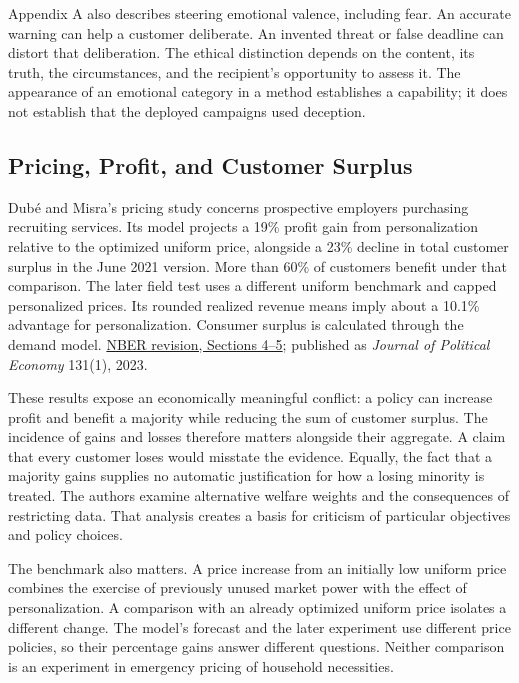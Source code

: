 Appendix A also describes steering emotional valence, including fear. An
accurate warning can help a customer deliberate. An invented threat or
false deadline can distort that deliberation. The ethical distinction
depends on the content, its truth, the circumstances, and the
recipient's opportunity to assess it. The appearance of an emotional
category in a method establishes a capability; it does not establish
that the deployed campaigns used deception.

\hypertarget{M09-pricing-profit-and-customer-surplus}{%
\subsection{Pricing, Profit, and Customer
Surplus}\label{M09-pricing-profit-and-customer-surplus}}

\noindent Dubé and Misra's pricing study concerns prospective employers purchasing
recruiting services. Its model projects a 19\% profit gain from
personalization relative to the optimized uniform price, alongside a
23\% decline in total customer surplus in the June 2021 version. More
than 60\% of customers benefit under that comparison. The later field
test uses a different uniform benchmark and capped personalized prices.
Its rounded realized revenue means imply about a 10.1\% advantage for
personalization. Consumer surplus is calculated through the demand
model.
\href{https://www.nber.org/system/files/working_papers/w23775/w23775.pdf}{NBER
revision, Sections 4--5}; published as \emph{Journal of Political
Economy} 131(1), 2023.

These results expose an economically meaningful conflict: a policy can
increase profit and benefit a majority while reducing the sum of
customer surplus. The incidence of gains and losses therefore matters
alongside their aggregate. A claim that every customer loses would
misstate the evidence. Equally, the fact that a majority gains supplies
no automatic justification for how a losing minority is treated. The
authors examine alternative welfare weights and the consequences of
restricting data. That analysis creates a basis for criticism of
particular objectives and policy choices.

The benchmark also matters. A price increase from an initially low
uniform price combines the exercise of previously unused market power
with the effect of personalization. A comparison with an already
optimized uniform price isolates a different change. The model's
forecast and the later experiment use different price policies, so their
percentage gains answer different questions. Neither comparison is an
experiment in emergency pricing of household necessities.

